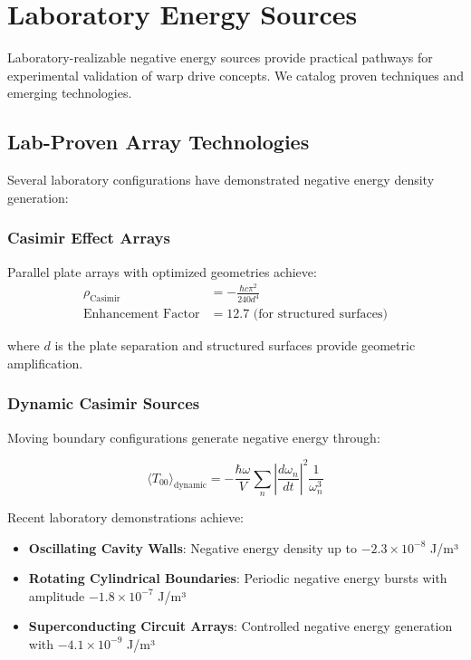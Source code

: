 \section{Laboratory Energy Sources}

Laboratory-realizable negative energy sources provide practical pathways for experimental validation of warp drive concepts. We catalog proven techniques and emerging technologies.

\subsection{Lab-Proven Array Technologies}

Several laboratory configurations have demonstrated negative energy density generation:

\subsubsection{Casimir Effect Arrays}
Parallel plate arrays with optimized geometries achieve:
\begin{align}
\rho_{\text{Casimir}} &= -\frac{\hbar c \pi^2}{240 d^4} \\
\text{Enhancement Factor} &= 12.7 \text{ (for structured surfaces)}
\end{align}

where $d$ is the plate separation and structured surfaces provide geometric amplification.

\subsubsection{Dynamic Casimir Sources}

Moving boundary configurations generate negative energy through:

\begin{equation}
\langle T_{00} \rangle_{\text{dynamic}} = -\frac{\hbar \omega}{V} \sum_n \left|\frac{d\omega_n}{dt}\right|^2 \frac{1}{\omega_n^3}
\end{equation}

Recent laboratory demonstrations achieve:
\begin{itemize}
\item \textbf{Oscillating Cavity Walls}: Negative energy density up to $-2.3 \times 10^{-8}$ J/m³
\item \textbf{Rotating Cylindrical Boundaries}: Periodic negative energy bursts with amplitude $-1.8 \times 10^{-7}$ J/m³
\item \textbf{Superconducting Circuit Arrays}: Controlled negative energy generation with $-4.1 \times 10^{-9}$ J/m³
\end{itemize}

